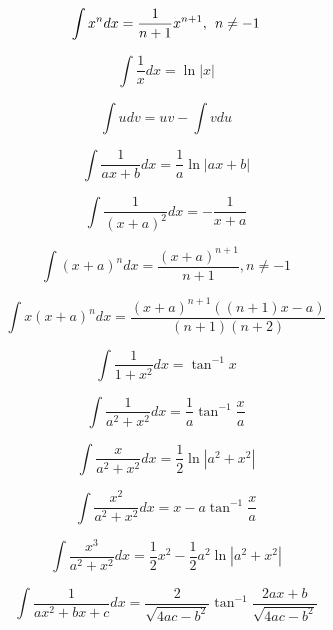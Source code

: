 \tiny
\begin{equation*}
\int x^n dx = \frac{1}{n+1}x^{n+1},\hspace{1ex}n\neq -1
\end{equation*}

\begin{equation*}
\int \frac{1}{x}dx = \ln |x|
\end{equation*}

\begin{equation*}
\int u dv = uv - \int v du
\end{equation*}

\begin{equation*}
\int \frac{1}{ax+b}dx = \frac{1}{a} \ln |ax + b| 
\end{equation*}

\begin{equation*}
\int \frac{1}{(x+a)^2}dx = -\frac{1}{x+a}
\end{equation*}

\begin{equation*}
\int (x+a)^n dx = \frac{(x+a)^{n+1}}{n+1}, n\ne -1
\end{equation*}

\begin{equation*}
\int x(x+a)^n dx = \frac{(x+a)^{n+1} ( (n+1)x-a)}{(n+1)(n+2)}
\end{equation*}

\begin{equation*}
\int \frac{1}{1+x^2}dx = \tan^{-1}x
\end{equation*}

\begin{equation*}
\int \frac{1}{a^2+x^2}dx = \frac{1}{a}\tan^{-1}\frac{x}{a}
\end{equation*}

\begin{equation*}
\int \frac{x}{a^2+x^2}dx = \frac{1}{2}\ln|a^2+x^2|
\end{equation*}

\begin{equation*}
\int \frac{x^2}{a^2+x^2}dx = x-a\tan^{-1}\frac{x}{a}
\end{equation*}

\begin{equation*}
\int \frac{x^3}{a^2+x^2}dx = \frac{1}{2}x^2-\frac{1}{2}a^2\ln|a^2+x^2|
\end{equation*}

\begin{equation*}
\int \frac{1}{ax^2+bx+c}dx = \frac{2}{\sqrt{4ac-b^2}}\tan^{-1}\frac{2ax+b}{\sqrt{4ac-b^2}}
\end{equation*}

